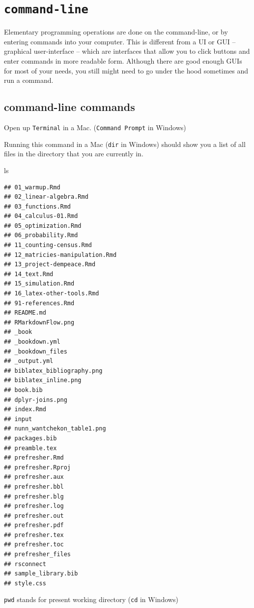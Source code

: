 \documentclass[]{book}
\newenvironment{Shaded}{\begin{snugshade}}{\end{snugshade}}
\newcommand{\FunctionTok}[1]{\textcolor[rgb]{0.00,0.00,0.00}{#1}}
\theoremstyle{definition}
\theoremstyle{definition}
\theoremstyle{definition}
\theoremstyle{remark}
\begin{document}
\section{\texorpdfstring{\texttt{command-line}}{command-line}}\label{command-line}

Elementary programming operations are done on the command-line, or by
entering commands into your computer. This is different from a UI or GUI
-- graphical user-interface -- which are interfaces that allow you to
click buttons and enter commands in more readable form. Although there
are good enough GUIs for most of your needs, you still might need to go
under the hood sometimes and run a command.

\subsection{command-line commands}\label{command-line-commands}

Open up \texttt{Terminal} in a Mac. (\texttt{Command\ Prompt} in
Windows)

Running this command in a Mac (\texttt{dir} in Windows) should show you
a list of all files in the directory that you are currently in.

\begin{Shaded}
\begin{Highlighting}[]
\FunctionTok{ls}
\end{Highlighting}
\end{Shaded}

\begin{verbatim}
## 01_warmup.Rmd
## 02_linear-algebra.Rmd
## 03_functions.Rmd
## 04_calculus-01.Rmd
## 05_optimization.Rmd
## 06_probability.Rmd
## 11_counting-census.Rmd
## 12_matricies-manipulation.Rmd
## 13_project-dempeace.Rmd
## 14_text.Rmd
## 15_simulation.Rmd
## 16_latex-other-tools.Rmd
## 91-references.Rmd
## README.md
## RMarkdownFlow.png
## _book
## _bookdown.yml
## _bookdown_files
## _output.yml
## biblatex_bibliography.png
## biblatex_inline.png
## book.bib
## dplyr-joins.png
## index.Rmd
## input
## nunn_wantchekon_table1.png
## packages.bib
## preamble.tex
## prefresher.Rmd
## prefresher.Rproj
## prefresher.aux
## prefresher.bbl
## prefresher.blg
## prefresher.log
## prefresher.out
## prefresher.pdf
## prefresher.tex
## prefresher.toc
## prefresher_files
## rsconnect
## sample_library.bib
## style.css
\end{verbatim}

\texttt{pwd} stands for present working directory (\texttt{cd} in
Windows)
\end{document}
